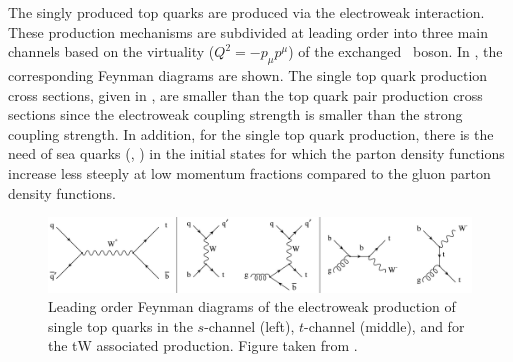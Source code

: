 The singly produced top quarks are produced via the electroweak interaction. These production mechanisms are subdivided at leading order into three main channels based on the virtuality ($Q^2 = - p_{\mu}p^{\mu}$) of the exchanged \PW\ boson. In , the corresponding Feynman diagrams are shown. The single top quark production cross sections, given in , are smaller than the top quark pair production cross sections since the electroweak coupling strength is smaller than the strong coupling strength. In addition, for the single top quark production, there is the need of sea quarks (\Pbottom, \APquark) in the initial states for which the parton density functions increase less steeply at low momentum fractions compared to the gluon parton density functions. 

\begin{figure}[htbp]
	\centering
	\includegraphics[width=1.\linewidth]{1_Introduction/Figures/single_Top_channels_0}
	\caption{Leading order Feynman diagrams of the electroweak production of single top quarks in the $s$-channel (left), $t$-channel (middle), and for the tW associated production. Figure taken from \cite{singletop}.}
	\label{fig:singletop}
\end{figure}

